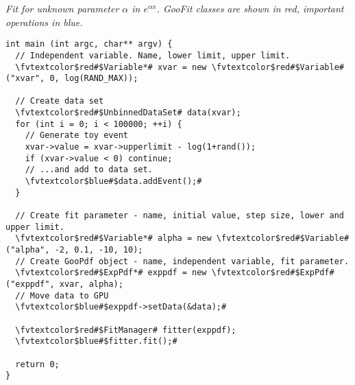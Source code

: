 \begin{listing}
\label{list:expexp} 
\emph{Fit for unknown parameter $\alpha$ in $e^{\alpha x}$. GooFit classes
are shown in red, important operations in blue.}

\begin{Verbatim}[commandchars=\\\$\#]
int main (int argc, char** argv) {
  // Independent variable. Name, lower limit, upper limit. 
  \fvtextcolor$red#$Variable*# xvar = new \fvtextcolor$red#$Variable#("xvar", 0, log(RAND_MAX)); 
  
  // Create data set
  \fvtextcolor$red#$UnbinnedDataSet# data(xvar);
  for (int i = 0; i < 100000; ++i) {
    // Generate toy event
    xvar->value = xvar->upperlimit - log(1+rand());
    if (xvar->value < 0) continue;
    // ...and add to data set. 
    \fvtextcolor$blue#$data.addEvent();# 
  }
  
  // Create fit parameter - name, initial value, step size, lower and upper limit. 
  \fvtextcolor$red#$Variable*# alpha = new \fvtextcolor$red#$Variable#("alpha", -2, 0.1, -10, 10);
  // Create GooPdf object - name, independent variable, fit parameter.
  \fvtextcolor$red#$ExpPdf*# exppdf = new \fvtextcolor$red#$ExpPdf#("exppdf", xvar, alpha); 
  // Move data to GPU
  \fvtextcolor$blue#$exppdf->setData(&data);#

  \fvtextcolor$red#$FitManager# fitter(exppdf);
  \fvtextcolor$blue#$fitter.fit();# 

  return 0;
}
\end{Verbatim}
\end{listing}


